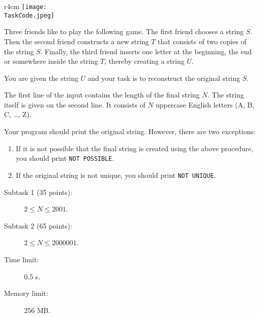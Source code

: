 \documentclass{boi2014}
\renewcommand{\TaskCode}{friends}
\begin{document}
    \begin{wrapfigure}{r}{4cm}
        \vspace{-24pt}
		\texttt{[image: \\TaskCode.jpeg]}
	\end{wrapfigure}
    Three friends like to play the following game.
    The first friend chooses a string $S$.
    Then the second friend constructs a new string $T$ that consists of
    two copies of the string $S$. 
    Finally, the third friend inserts one letter at the beginning, the end or somewhere
    inside the string $T$, thereby creating a string $U$.

    \Task
    You are given the string $U$ and your task is to reconstruct the original string $S$.

    \Input
    The first line of the input contains the length of the final string $N$.
    The string itself is given on the second line. It consists of $N$
    uppercase English letters (A, B, C, \ldots{}, Z).

    \Output
    Your program should print the original string.
    However, there are two exceptions:
    \begin{enumerate}
        \item If it is not possible that the final string is created using the above
        procedure, you should print {\tt NOT POSSIBLE}.
        \item If the original string is not unique, you should print {\tt NOT
        UNIQUE}.
    \end{enumerate}

    \Examples


    \Scoring

    \begin{description}
        \item[Subtask 1 (35 points):] $2 \le N \le 2001$.
        \item[Subtask 2 (65 points):] $2 \le N \le 2000001$.
    \end{description}

    \Constraints

    \begin{description}
        \item[Time limit:] 0.5 s.
        \item[Memory limit:] 256 MB.
    \end{description}
\end{document}
